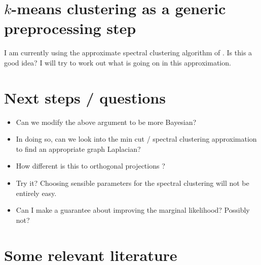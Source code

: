 \documentclass{article}
\numberwithin{equation}{section}
\numberwithin{thm}{section}
\begin{document}

\cite{Griffiths2011}
\cite{Luxburg2007}
\cite{Cui2007}
\cite{Niu2010}
\cite{Niu2011}
\cite{Niu2012}

\section{$k$-means clustering as a generic preprocessing step}

I am currently using the approximate spectral clustering algorithm of \cite{Yan2009}.
Is this a good idea?
I will try to work out what is going on in this approximation.

\section{Next steps / questions}
\begin{itemize}
\item Can we modify the above argument to be more Bayesian?
\item In doing so, can we look into the min cut / spectral clustering approximation to find an appropriate graph Laplacian?
\item How different is this to orthogonal projections \citep{Cui2007}?
\item Try it? Choosing sensible parameters for the spectral clustering will not be entirely easy.
\item Can I make a guarantee about improving the marginal likelihood? Possibly not?
\end{itemize}

\section{Some relevant literature}


\small{

%

}
\end{document}
